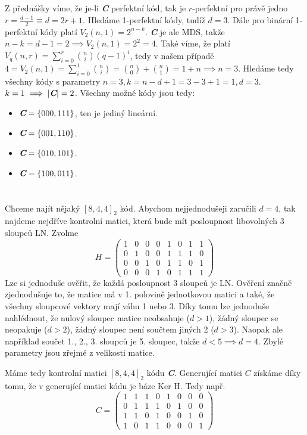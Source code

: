 \documentclass[12pt, a4paper]{article}
\begin{document}
\section{}
Z přednášky víme, že je-li \textit{\textbf{C}} perfektní kód, tak je $r$-perfektní pro právě jedno $r=\frac{d-1}{2} \equiv d=2r+1$. Hledáme 1-perfektní kódy, tudíž $d=3$. Dále pro binární 1-perfektní kódy platí $V_{2}(n,1)=2^{n-k}$. \textit{\textbf{C}} je ale MDS, takže $n-k=d-1=2 \implies V_{2}(n,1)=2^{2}=4$. Také víme, že platí $V_{q}(n,r)=\sum_{i=0}^{r} \binom{n}{i}(q-1)^i$, tedy v našem případě $4=V_{2}(n,1)=\sum_{i=0}^{1} \binom{n}{i}=\binom{n}{0}+\binom{n}{1}=1+n \implies n = 3$. Hledáme tedy všechny kódy s parametry $n=3, k=n-d+1=3-3+1=1, d=3$. $k=1 \implies |\textit{\textbf{C}}|=2$. Všechny možné kódy jsou tedy:
\begin{itemize}
    \item $\textit{\textbf{C}}=\{000,111\}$, ten je jediný lineární.
    \item $\textit{\textbf{C}}=\{001,110\}$.
    \item $\textit{\textbf{C}}=\{010,101\}$.
    \item $\textit{\textbf{C}}=\{100,011\}$.
\end{itemize}


\section{}
Chceme najít nějaký $[8,4,4]_{2}$ kód. Abychom nejjednodušeji zaručili $d=4$, tak najdeme nejdříve kontrolní matici, která bude mít posloupnost libovolných 3 sloupců LN. Zvolme 
\[
H= \begin{pmatrix}
1 & 0 & 0 & 0 & 1 & 0 & 1 & 1 \\ 
0 & 1 & 0 & 0 & 1 & 1 & 1 & 0 \\ 
0 & 0 & 1 & 0 & 1 & 1 & 0 & 1 \\ 
0 & 0 & 0 & 1 & 0 & 1 & 1 & 1 
\end{pmatrix}
\]
Lze si jednoduše ověřit, že každá posloupnost 3 sloupců je LN. Ověření značně zjednodušuje to, že matice má v 1. polovině jednotkovou matici a také, že všechny sloupcové vektory mají váhu 1 nebo 3. Díky tomu lze jednoduše nahlédnout, že nulový sloupec matice neobsahuje ($d>1$), žádný sloupec se neopakuje ($d>2$), žádný sloupec není součtem jiných 2 ($d>3$). Naopak ale například součet 1., 2., 3. sloupců je 5. sloupec, takže $d<5 \implies d=4$. Zbylé parametry jsou zřejmé z velikosti matice. 

Máme tedy kontrolní matici $[8,4,4]_{2}$ kódu \textit{\textbf{C}}. Generující matici $C$ získáme díky tomu, že v generující matici kódu je báze Ker H. Tedy např.
\[
C= \begin{pmatrix}
1 & 1 & 1 & 0 & 1 & 0 & 0 & 0 \\ 
0 & 1 & 1 & 1 & 0 & 1 & 0 & 0 \\ 
1 & 1 & 0 & 1 & 0 & 0 & 1 & 0 \\ 
1 & 0 & 1 & 1 & 0 & 0 & 0 & 1 
\end{pmatrix}
\]
\end{document}
